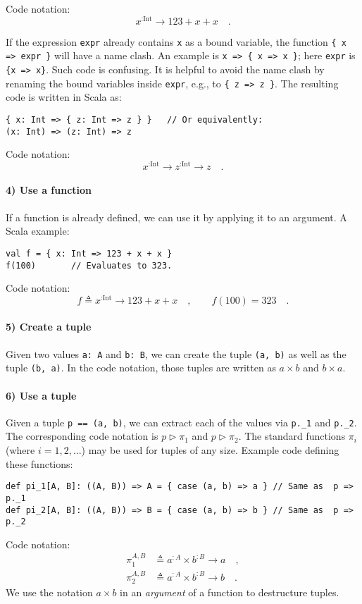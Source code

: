 Code notation:
\[
x^{:\text{Int}}\rightarrow123+x+x\quad.
\]

If the expression \lstinline!expr! already contains \lstinline!x!
as a bound variable, the function \lstinline!{ x => expr }! will
have a name clash. An example is \lstinline!x => { x => x }!; here
\lstinline!expr! is \lstinline!{x => x}!. Such code is confusing.
It is helpful to avoid the name clash by renaming the bound variables
inside \lstinline!expr!, e.g., to \lstinline!{ z => z }!. The resulting
code is written in Scala as:
\begin{lstlisting}
{ x: Int => { z: Int => z } }   // Or equivalently:
(x: Int) => (z: Int) => z
\end{lstlisting}
Code notation:
\[
x^{:\text{Int}}\rightarrow z^{:\text{Int}}\rightarrow z\quad.
\]


\paragraph{4) Use a function}

If a function is already defined, we can use it by applying it to
an argument. A Scala example:
\begin{lstlisting}
val f = { x: Int => 123 + x + x }
f(100)       // Evaluates to 323.
\end{lstlisting}
Code notation:
\[
f\triangleq x^{:\text{Int}}\rightarrow123+x+x\quad,\quad\quad f(100)=323\quad.
\]


\paragraph{5) Create a tuple}

Given two values \lstinline!a: A! and \lstinline!b: B!, we can create
the tuple \lstinline!(a, b)! as well as the tuple \lstinline!(b, a)!.
In the code notation, those tuples are written as $a\times b$ and
$b\times a$.

\paragraph{6) Use a tuple}

Given a tuple \lstinline!p == (a, b)!, we can extract each of the
values via \lstinline!p._1! and \lstinline!p._2!. The corresponding
code notation is $p\triangleright\pi_{1}$ and $p\triangleright\pi_{2}$.
The standard functions $\pi_{i}$ (where $i=1,2,...$) may be used
for tuples of any size. Example code defining these functions:
\begin{lstlisting}
def pi_1[A, B]: ((A, B)) => A = { case (a, b) => a } // Same as  p => p._1
def pi_2[A, B]: ((A, B)) => B = { case (a, b) => b } // Same as  p => p._2
\end{lstlisting}
Code notation:
\begin{align*}
\pi_{1}^{A,B} & \triangleq a^{:A}\times b^{:B}\rightarrow a\quad,\\
\pi_{2}^{A,B} & \triangleq a^{:A}\times b^{:B}\rightarrow b\quad.
\end{align*}
We use the notation $a\times b$ in an \emph{argument} of a function
to destructure tuples.

